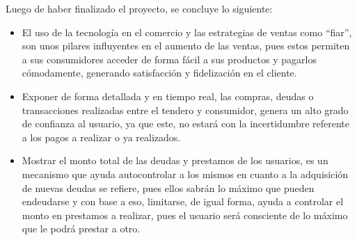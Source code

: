 Luego de haber finalizado el proyecto, se concluye lo siguiente:

\begin{itemize}
	
	\item El uso de la tecnología en el comercio y las estrategias de ventas como “fiar”, son unos pilares influyentes en el aumento de las ventas, pues estos permiten a sus consumidores acceder de forma fácil a sus productos y pagarlos cómodamente, generando satisfacción y fidelización en el cliente.
	
	\item Exponer de forma detallada y en tiempo real, las compras, deudas o transacciones realizadas entre el tendero y consumidor, genera un alto grado de confianza al usuario, ya que este, no estará con la incertidumbre referente a los pagos a realizar o ya realizados.
	
	\item Mostrar el monto total de las deudas y prestamos de los usuarios, es un mecanismo que ayuda autocontrolar a los mismos en cuanto a la adquisición de nuevas deudas se refiere, pues ellos sabrán lo máximo que pueden endeudarse y con base a eso, limitarse, de igual forma, ayuda a controlar el monto en prestamos a realizar, pues el usuario será consciente de lo máximo que le podrá prestar a otro.
	
\end{itemize}